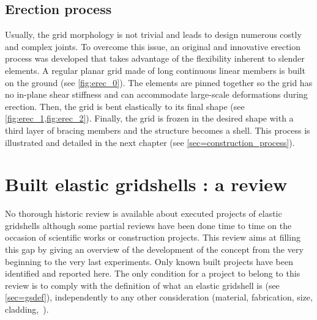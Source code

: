 \subsection{Erection process}\label{sec=def_erec}
Usually, the grid morphology is not trivial and leads to design numerous costly and complex joints. To overcome this issue, an original and innovative erection process was developed that takes advantage of the flexibility inherent to slender elements. A regular planar grid made of long continuous linear members is built on the ground (see \cref{fig:erec_0}). The elements are pinned together so the grid has no in-plane shear stiffness and can accommodate large-scale deformations during erection. Then, the grid is bent elastically to its final shape (see \cref{fig:erec_1,fig:erec_2}). Finally, the grid is frozen in the desired shape with a third layer of bracing members and the structure becomes a shell. This process is illustrated and detailed in the next chapter (see \cref{sec=construction_process}).


\pagebreak
\section{Built elastic gridshells : a review}\label{sec=review_project}

No thorough historic review is available about executed projects of elastic gridshells although some partial reviews have been done time to time on the occasion of scientific works or construction projects. This review aims at filling this gap by giving an overview of the development of the concept from the very beginning to the very last experiments. Only known built projects have been identified and reported here. The only condition for a project to belong to this review is to comply with the definition of what an elastic gridshell is (see \cref{sec=gsdef}), independently to any other consideration (material, fabrication, size, cladding,~\telp{}).

